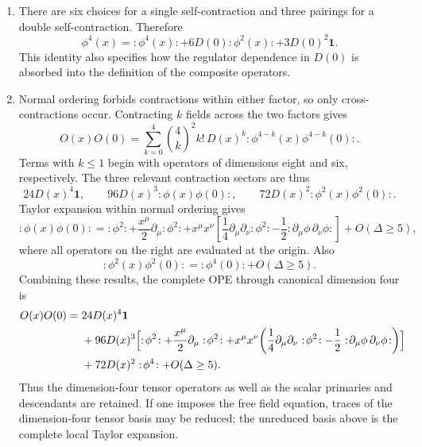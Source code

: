 
\begin{enumerate}
  \begin{enumerate}
    \item[(a)]
    There are six choices for a single self-contraction and three pairings
    for a double self-contraction.  Therefore
    \[
      \boxed{\phi^4(x)=:\!\phi^4(x)\!:
        +6D(0):\!\phi^2(x)\!:+3D(0)^2\mathbf{1}.}
    \]
    This identity also specifies how the regulator dependence in \(D(0)\)
    is absorbed into the definition of the composite operators.
    \item[(b)]
    Normal ordering forbids contractions within either factor, so only
    cross-contractions occur.  Contracting \(k\) fields across the two
    factors gives
    \[
      O(x)O(0)
       =\sum_{k=0}^4\binom4k^2k!\,D(x)^k
          :\!\phi^{4-k}(x)\phi^{4-k}(0)\!:.
    \]
    Terms with \(k\leq1\) begin with operators of dimensions eight and six,
    respectively.  The three relevant contraction sectors are thus
    \[
      24D(x)^4\mathbf{1},\qquad
      96D(x)^3:\!\phi(x)\phi(0)\!:,\qquad
      72D(x)^2:\!\phi^2(x)\phi^2(0)\!:.
    \]
    Taylor expansion within normal ordering gives
    \[
      :\!\phi(x)\phi(0)\!:
       =:\!\phi^2\!:
        +\frac{x^\mu}{2}\partial_\mu:\!\phi^2\!:
        +x^\mu x^\nu
          \left[\frac14\partial_\mu\partial_\nu:\!\phi^2\!:
                -\frac12:\!\partial_\mu\phi\,\partial_\nu\phi\!:\right]
        +O(\Delta\geq5),
    \]
    where all operators on the right are evaluated at the origin.  Also
    \[
      :\!\phi^2(x)\phi^2(0)\!:
        =:\!\phi^4(0)\!:+O(\Delta\geq5).
    \]
    Combining these results, the complete OPE through canonical dimension
    four is
    \[
      \begin{aligned}
      O(x)O(0)={}&24D(x)^4\mathbf{1}\\
       &+96D(x)^3\Bigl[
          :\!\phi^2\!:
          +\frac{x^\mu}{2}\partial_\mu:\!\phi^2\!:
          +x^\mu x^\nu\!
            \left(\frac14\partial_\mu\partial_\nu:\!\phi^2\!:
                 -\frac12:\!\partial_\mu\phi\,\partial_\nu\phi\!:\right)
        \Bigr]\\
       &+72D(x)^2:\!\phi^4\!:+O(\Delta\geq5).
      \end{aligned}
    \]
    Thus the dimension-four tensor operators as well as the scalar
    primaries and descendants are retained.  If one imposes the free field
    equation, traces of the dimension-four tensor basis may be reduced; the
    unreduced basis above is the complete local Taylor expansion.
  \end{enumerate}


\end{enumerate}
